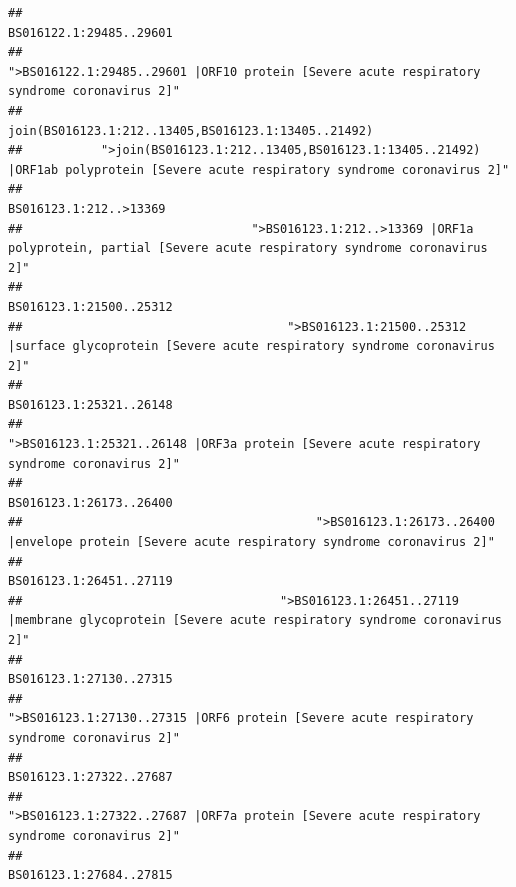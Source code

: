\documentclass[
]{article}
\begin{document}
\begin{verbatim}
##                                                                                                                BS016122.1:29485..29601 
##                                            ">BS016122.1:29485..29601 |ORF10 protein [Severe acute respiratory syndrome coronavirus 2]" 
##                                                                                    join(BS016123.1:212..13405,BS016123.1:13405..21492) 
##           ">join(BS016123.1:212..13405,BS016123.1:13405..21492) |ORF1ab polyprotein [Severe acute respiratory syndrome coronavirus 2]" 
##                                                                                                                 BS016123.1:212..>13369 
##                                ">BS016123.1:212..>13369 |ORF1a polyprotein, partial [Severe acute respiratory syndrome coronavirus 2]" 
##                                                                                                                BS016123.1:21500..25312 
##                                     ">BS016123.1:21500..25312 |surface glycoprotein [Severe acute respiratory syndrome coronavirus 2]" 
##                                                                                                                BS016123.1:25321..26148 
##                                            ">BS016123.1:25321..26148 |ORF3a protein [Severe acute respiratory syndrome coronavirus 2]" 
##                                                                                                                BS016123.1:26173..26400 
##                                         ">BS016123.1:26173..26400 |envelope protein [Severe acute respiratory syndrome coronavirus 2]" 
##                                                                                                                BS016123.1:26451..27119 
##                                    ">BS016123.1:26451..27119 |membrane glycoprotein [Severe acute respiratory syndrome coronavirus 2]" 
##                                                                                                                BS016123.1:27130..27315 
##                                             ">BS016123.1:27130..27315 |ORF6 protein [Severe acute respiratory syndrome coronavirus 2]" 
##                                                                                                                BS016123.1:27322..27687 
##                                            ">BS016123.1:27322..27687 |ORF7a protein [Severe acute respiratory syndrome coronavirus 2]" 
##                                                                                                                BS016123.1:27684..27815 

\end{verbatim}
\end{document}
